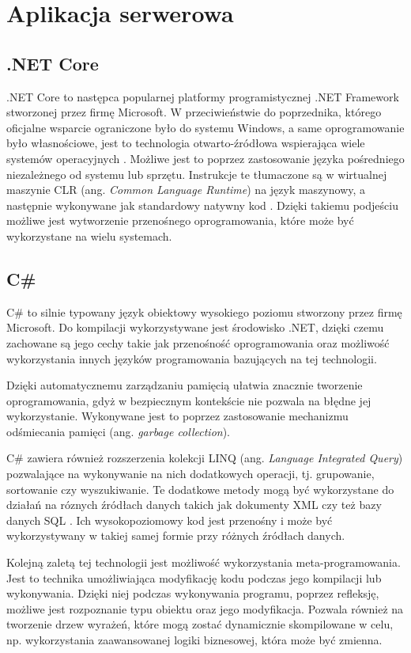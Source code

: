 \section{Aplikacja serwerowa}

\subsection*{.NET Core}
.NET Core\cite{netcore} to następca popularnej platformy programistycznej .NET Framework stworzonej przez
firmę Microsoft. W przeciwieństwie do poprzednika, którego oficjalne wsparcie ograniczone było
do systemu Windows, a same oprogramowanie było własnościowe, jest to technologia otwarto-źródłowa
wspierająca wiele systemów operacyjnych \cite{price2021c}. Możliwe jest to poprzez zastosowanie
języka pośredniego niezależnego od systemu lub sprzętu. Instrukcje te tłumaczone są w 
wirtualnej maszynie CLR (ang. \textit{Common Language Runtime}) na język maszynowy, a
następnie wykonywane jak standardowy natywny kod \cite{msdn:clr}. Dzięki takiemu podjeściu
możliwe jest wytworzenie przenośnego oprogramowania, które może być wykorzystane na wielu
systemach.

\subsection*{C\#}
C\#\cite{csharp} to silnie typowany język obiektowy wysokiego poziomu stworzony przez firmę Microsoft.
Do kompilacji wykorzystywane jest środowisko .NET, dzięki czemu zachowane są
jego cechy takie jak przenośność oprogramowania oraz możliwość wykorzystania
innych języków programowania bazujących na tej technologii.

Dzięki automatycznemu zarządzaniu pamięcią ułatwia znacznie tworzenie
oprogramowania, gdyż w bezpiecznym kontekście nie pozwala na 
błędne jej wykorzystanie. Wykonywane jest to poprzez zastosowanie
mechanizmu odśmiecania pamięci (ang. \textit{garbage collection}).

C\# zawiera również rozszerzenia kolekcji LINQ (ang. \textit{Language Integrated Query})
pozwalające na wykonywanie na nich dodatkowych operacji, tj. grupowanie, sortowanie czy wyszukiwanie.
Te dodatkowe metody mogą być wykorzystane do działań na róznych źródłach danych takich jak dokumenty XML
czy też bazy danych SQL \cite{zhang2014}. Ich wysokopoziomowy kod jest przenośny i może być
wykorzystywany w takiej samej formie przy różnych źródłach danych.

Kolejną zaletą tej technologii jest możliwość wykorzystania meta-programowania. 
Jest to technika umożliwiająca modyfikację kodu podczas jego kompilacji lub wykonywania. 
Dzięki niej podczas wykonywania programu, poprzez refleksję, możliwe jest rozpoznanie
typu obiektu oraz jego modyfikacja. Pozwala również na tworzenie drzew wyrażeń, które
mogą zostać dynamicznie skompilowane w celu, np. wykorzystania zaawansowanej logiki
biznesowej, która może być zmienna.

